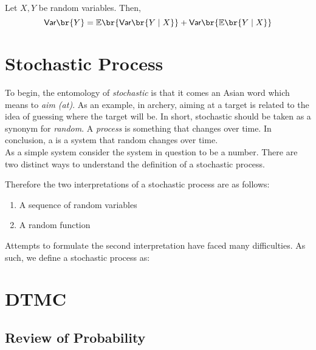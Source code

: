 \documentclass{article}
\newcommand{\Var}{\textsf{Var}}
\newcommand{\Exp}{\mathbb{E}}
\begin{document}
\begin{theorem}
     Let $X, Y$ be random variables. Then,
    \[ \Var \br{Y} = \Exp\br{\Var\br{Y \mid X}} + \Var\br{\Exp\br{Y \mid X}} \]

\end{theorem}

\section{Stochastic Process}

To begin, the entomology of \textit{stochastic} is that it comes an Asian word which means to \textit{aim (at)}. As an example, in archery, aiming at a target is related to the idea of guessing where the target will be. In short, stochastic should be taken as a synonym for \textit{random}. A \textit{process} is something that changes over time.  In conclusion, a  is a system that random changes over time. \\

As a simple system consider the system in question to be a number. There are two distinct ways to understand the definition of a stochastic process.

\begin{center}
\end{center}
Therefore the two interpretations of a stochastic process are as follows:
\begin{enumerate}
    \item A sequence of random variables
    \item A random function
\end{enumerate}
Attempts to formulate the second interpretation have faced many difficulties. As such, we define a stochastic process as:
\section{DTMC}

\subsection{Review of Probability}
\end{document}
